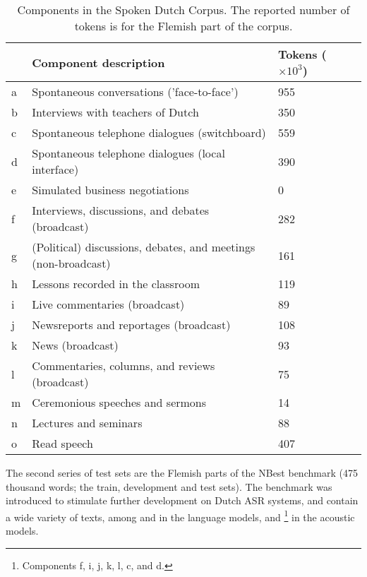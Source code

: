     \begin{table}
    	\begin{tabular}{llll}
              & Component description & \thead{Tokens \\ ($\times 10^3$)} \\ \hline
        	a & Spontaneous conversations ('face-to-face') & 955 & \\
            b & Interviews with teachers of Dutch & 350 & \\
            c & Spontaneous telephone dialogues (switchboard) & 559 & \\ %
            d & Spontaneous telephone dialogues (local interface) & 390 & \\ %
            e & Simulated business negotiations & 0 & \\
            f & Interviews, discussions, and debates (broadcast) & 282 & \\
            g & (Political) discussions, debates, and meetings (non-broadcast) & 161 & \\
            h & Lessons recorded in the classroom & 119 & \\
            i & Live commentaries (broadcast) & 89 & \\
            j & Newsreports and reportages (broadcast) & 108 & \\
            k & News (broadcast) & 93 & \\
            l & Commentaries, columns, and reviews (broadcast) & 75 & \\
            m & Ceremonious speeches and sermons & 14 & \\ 
            n & Lectures and seminars & 88 & \\
            o & Read speech & 407 & 
        \end{tabular}
        \caption{Components in the Spoken Dutch Corpus. The reported number of tokens is for the Flemish part of the corpus. }
        \label{tab:cgn}
    \end{table}
    
    The second series of test sets are the Flemish parts of the NBest benchmark \cite{kessens2007n} (475 thousand words; the train, development and test sets). The benchmark was introduced to stimulate further development on Dutch ASR systems, and contain a wide variety of texts, among \mediargus and \cgn in the language models, and \cgn\footnote{Components f, i, j, k, l, c, and d.}  in the acoustic models.
 
    

